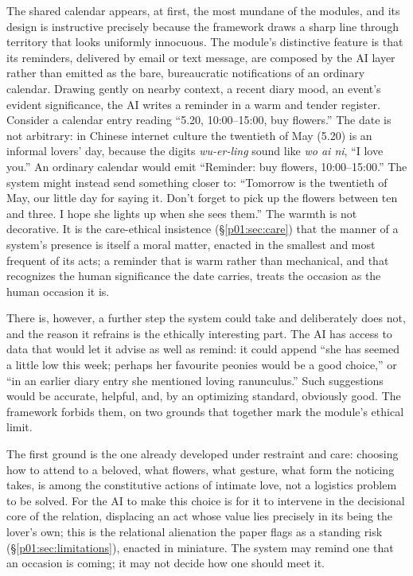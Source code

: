 The shared calendar appears, at first, the most mundane of the modules, and its design is instructive precisely because the framework draws a sharp line through territory that looks uniformly innocuous. The module's distinctive feature is that its reminders, delivered by email or text message, are composed by the AI layer rather than emitted as the bare, bureaucratic notifications of an ordinary calendar. Drawing gently on nearby context, a recent diary mood, an event's evident significance, the AI writes a reminder in a warm and tender register. Consider a calendar entry reading ``5.20, 10:00--15:00, buy flowers.'' The date is not arbitrary: in Chinese internet culture the twentieth of May (5.20) is an informal lovers' day, because the digits \emph{wu-er-ling} sound like \emph{wo ai ni}, ``I love you.'' An ordinary calendar would emit ``Reminder: buy flowers, 10:00--15:00.'' The system might instead send something closer to: ``Tomorrow is the twentieth of May, our little day for saying it. Don't forget to pick up the flowers between ten and three. I hope she lights up when she sees them.'' The warmth is not decorative. It is the care-ethical insistence (§\ref{p01:sec:care}) that the manner of a system's presence is itself a moral matter, enacted in the smallest and most frequent of its acts; a reminder that is warm rather than mechanical, and that recognizes the human significance the date carries, treats the occasion as the human occasion it is.

There is, however, a further step the system could take and deliberately does not, and the reason it refrains is the ethically interesting part. The AI has access to data that would let it advise as well as remind: it could append ``she has seemed a little low this week; perhaps her favourite peonies would be a good choice,'' or ``in an earlier diary entry she mentioned loving ranunculus.'' Such suggestions would be accurate, helpful, and, by an optimizing standard, obviously good. The framework forbids them, on two grounds that together mark the module's ethical limit.

The first ground is the one already developed under restraint and care: choosing how to attend to a beloved, what flowers, what gesture, what form the noticing takes, is among the constitutive actions of intimate love, not a logistics problem to be solved. For the AI to make this choice is for it to intervene in the decisional core of the relation, displacing an act whose value lies precisely in its being the lover's own; this is the relational alienation the paper flags as a standing risk (§\ref{p01:sec:limitations}), enacted in miniature. The system may remind one that an occasion is coming; it may not decide how one should meet it.

